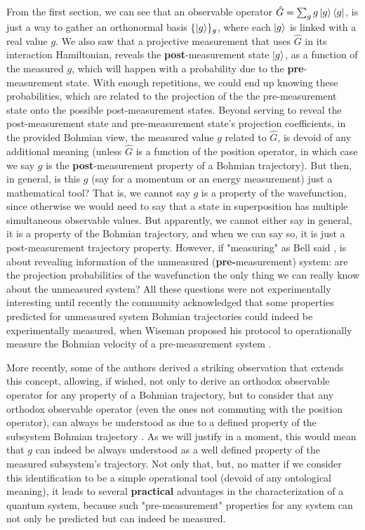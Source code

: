 \documentclass[11pt, a4paper]{article} %
\begin{document}
From the first section, we can see that an observable operator $\hat{G}=\sum_g g\ket{g}\bra{g}$, is just a way to gather an orthonormal basis $\{\ket{g}\}_g$, where each $\ket{g}$ is linked with a real value $g$. We also saw that a projective measurement that uses $\hat{G}$ in its interaction Hamiltonian, reveals the {\bf post}-measurement state $\ket{g}$, as a function of the measured $g$, which will happen with a probability due to the {\bf pre}-measurement state. With enough repetitions, we could end up knowing these probabilities, which are related to the projection of the the pre-measurement state onto the possible post-measurement states. Beyond serving to reveal the post-measurement state and pre-measurement state's projection coefficients, in the provided Bohmian view, the measured value $g$ related to $\hat{G}$, is devoid of any additional meaning (unless $\hat{G}$ is a function of the position operator, in which case we say $g$ is the {\bf post}-measurement property of a Bohmian trajectory). But then, in general, is this $g$ (say for a momentum or an energy measurement) just a mathematical tool? That is, we cannot say $g$ is a property of the wavefunction, since otherwise we would need to say that a state in superposition has multiple simultaneous observable values. But apparently, we cannot either say in general, it is a property of the Bohmian trajectory, and when we can say so, it is just a post-measurement trajectory property. However, if "measuring" as Bell said \cite{Bell}, is about revealing information of the unmeasured ({\bf pre-}measurement) system: are the projection probabilities of the wavefunction the only thing we can really know about the unmeasured system? All these questions were not experimentally interesting until recently the community acknowledged that some properties predicted for unmeasured system Bohmian trajectories could indeed be experimentally measured, when Wiseman proposed his protocol to operationally measure the Bohmian velocity of a pre-measurement system \cite{WisemanVel}.

More recently, some of the authors derived a striking observation that extends this concept, allowing, if wished, not only to derive an orthodox observable operator for any property of a Bohmian trajectory, but to consider that any orthodox observable operator (even the ones not commuting with the position operator), can always be understood as due to a defined property of the subsystem Bohmian trajectory \cite{DevInPosition1, DevInPosition2}. As we will justify in a moment, this would mean that $g$ can indeed be always understood as a well defined property of the measured subsystem's trajectory. Not only that, but, no matter if we consider this identification to be a simple operational tool (devoid of any ontological meaning), it leads to several {\bf practical} advantages in the characterization of a quantum system, because such "pre-measurement" properties for any system can not only be predicted but can indeed be measured.
\end{document}
